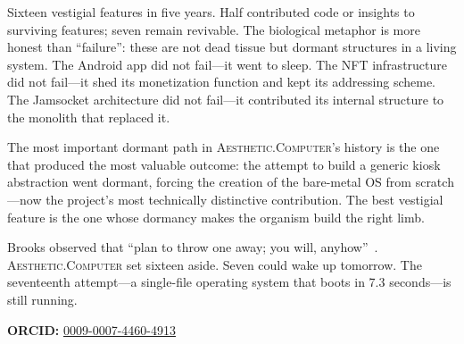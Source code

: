 \documentclass[10pt,letterpaper,twocolumn]{article}
\newcommand{\ac}{\textsc{Aesthetic.Computer}}
\begin{document}
Sixteen vestigial features in five years. Half contributed code or insights to surviving features; seven remain revivable. The biological metaphor is more honest than ``failure'': these are not dead tissue but dormant structures in a living system. The Android app did not fail---it went to sleep. The NFT infrastructure did not fail---it shed its monetization function and kept its addressing scheme. The Jamsocket architecture did not fail---it contributed its internal structure to the monolith that replaced it.

The most important dormant path in \ac{}'s history is the one that produced the most valuable outcome: the attempt to build a generic kiosk abstraction went dormant, forcing the creation of the bare-metal OS from scratch---now the project's most technically distinctive contribution. The best vestigial feature is the one whose dormancy makes the organism build the right limb.

Brooks observed that ``plan to throw one away; you will, anyhow''~\citep{brooks1975mythical}. \ac{} set sixteen aside. Seven could wake up tomorrow. The seventeenth attempt---a single-file operating system that boots in 7.3 seconds---is still running.

\vspace{0.5em}
\noindent\textbf{ORCID:} \href{https://orcid.org/0009-0007-4460-4913}{0009-0007-4460-4913}



\end{document}
